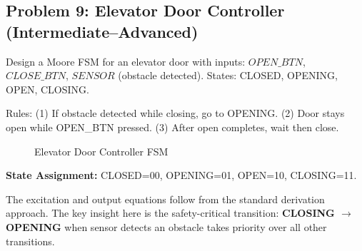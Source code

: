\documentclass[12pt,a4paper]{article}
\begin{document}
\subsection{Problem 9: Elevator Door Controller (Intermediate--Advanced)}

\begin{infobox}
Design a Moore FSM for an elevator door with inputs: $OPEN\_BTN$, $CLOSE\_BTN$, $SENSOR$ (obstacle detected). States: CLOSED, OPENING, OPEN, CLOSING.

Rules: (1) If obstacle detected while closing, go to OPENING. (2) Door stays open while OPEN\_BTN pressed. (3) After open completes, wait then close.
\end{infobox}

\begin{figure}[H]
\centering
{}
\caption{Elevator Door Controller FSM}
\end{figure}

\textbf{State Assignment:} CLOSED=00, OPENING=01, OPEN=10, CLOSING=11.

The excitation and output equations follow from the standard derivation approach. The key insight here is the safety-critical transition: \textbf{CLOSING $\to$ OPENING} when sensor detects an obstacle takes priority over all other transitions.
\end{document}
